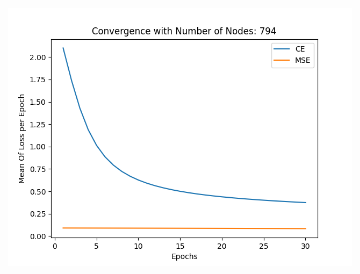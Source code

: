 \documentclass[12pt,a4paper]{article}
\begin{document}
\begin{enumerate}[a]
\begin{figure}[H]
\begin{subfigure}[t]{0.5\textwidth}
                    \end{subfigure}
                    \begin{subfigure}[t]{0.5\textwidth}
                        \includegraphics[width=10cm,height=7cm,left]{images/794.png} 
                    \end{subfigure}
            \end{figure}


\end{enumerate}
\end{document}
